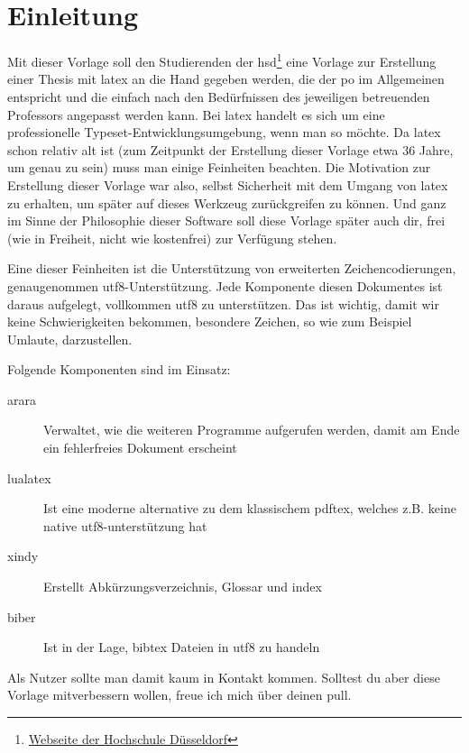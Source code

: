 \newpage

\section{Einleitung}%
\label{sec:einl}
Mit dieser Vorlage soll den Studierenden der \gls{hsd}\footnote{\href{https://www.hs-duesseldorf.de}{Webseite der Hochschule Düsseldorf}} eine Vorlage zur Erstellung einer Thesis mit \gls{latex} an die Hand gegeben werden, die der \gls{po} im Allgemeinen entspricht und die einfach nach den Bedürfnissen des jeweiligen betreuenden Professors angepasst werden kann. Bei \gls{latex} handelt es sich um eine \glqq professionelle Typeset-Entwicklungsumgebung\grqq, wenn man so möchte. Da \gls{latex} schon
relativ alt ist (zum Zeitpunkt der Erstellung dieser Vorlage etwa 36 Jahre, um genau zu sein) muss man einige Feinheiten beachten. Die Motivation zur Erstellung dieser Vorlage war also, selbst Sicherheit mit dem Umgang von \gls{latex} zu erhalten, um später auf dieses Werkzeug zurückgreifen zu können. Und ganz im Sinne der Philosophie dieser Software soll diese Vorlage später auch dir, frei (wie in Freiheit, nicht wie kostenfrei) zur Verfügung stehen.

Eine dieser Feinheiten ist die Unterstützung von erweiterten Zeichencodierungen, genaugenommen \gls{utf8}-Unterstützung.
Jede Komponente diesen Dokumentes ist daraus aufgelegt, vollkommen \gls{utf8} zu unterstützen. Das ist wichtig, damit wir keine Schwierigkeiten bekommen, \glqq besondere Zeichen\grqq, so wie zum Beispiel Umlaute, darzustellen.

Folgende Komponenten sind im Einsatz:
\begin{description}
  \item[arara] Verwaltet, wie die weiteren Programme aufgerufen werden, damit am Ende ein fehlerfreies Dokument erscheint
  \item[lualatex] Ist eine moderne alternative zu dem klassischem \glqq pdftex\grqq , welches z.B. keine native \gls{utf8}-unterstützung hat
  \item[xindy] Erstellt Abkürzungsverzeichnis, Glossar und index
  \item[biber] Ist in der Lage, bibtex Dateien in \gls{utf8} zu handeln
\end{description}

Als Nutzer sollte man damit kaum in Kontakt kommen. Solltest du aber diese Vorlage mitverbessern wollen, freue ich mich über deinen \gls{pull}.

